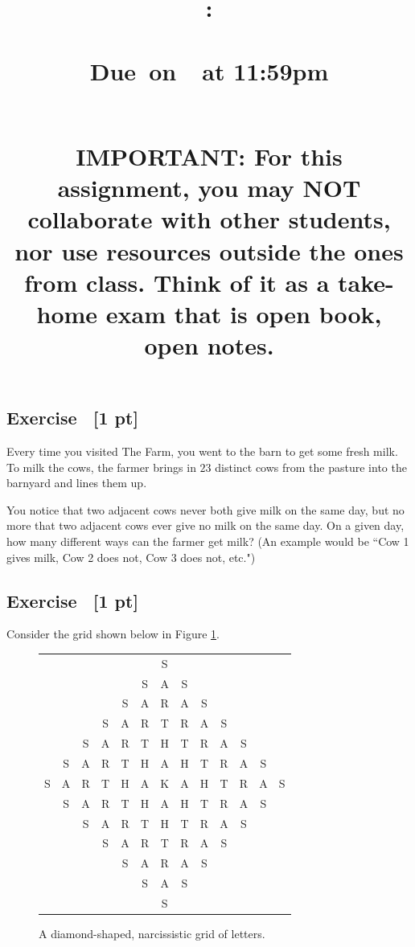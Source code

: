 \documentclass{article}
\title{
    \vspace{2in}
    \textbf{\hmwkClass:\\ \hmwkTitle} \\
    \normalsize\vspace{0.1in}\small{Due\ on\ \hmwkDueDate\ at 11:59pm} \\
    \vspace{0.1in}\large{\textit{\hmwkClassInstructor\ \hmwkSection}} \\
    \vspace{1in}
    \begin{minipage}[t]{0.5\columnwidth}
    {\footnotesize \textbf{IMPORTANT:} For this assignment, you may NOT collaborate with other students, nor use resources outside the ones from class. Think of it as a take-home exam that is open book, open notes.}
    \end{minipage}
    \vspace{1in}
    \author{\textbf{\hmwkAuthorName}}
    \date{}
}
\newcounter{counter}
\newcommand{\Exercise}{Exercise \stepcounter{counter}\thecounter}
\begin{document}
    
\maketitle
\pagebreak

\subsection*{\Exercise \ {\bf [1 pt]}}
    Every time you visited The Farm, you went to the barn to get some fresh milk. To milk the cows, the farmer brings in $23$ distinct cows from the pasture into the barnyard and lines them up.

    \vspace{1.5mm}
    You notice that two adjacent cows never both give milk on the same day, but no more that two adjacent cows ever give no milk on the same day. On a given day, how many different ways can the farmer get milk? (An example would be ``Cow 1 gives milk, Cow 2 does not, Cow 3 does not, etc.")

\subsection*{\Exercise \ {\bf [1 pt]}}
    Consider the grid shown below in Figure \ref{E2}.
    
    \vspace{1mm}
    \setlength{\tabcolsep}{2.7pt}
    \begin{figure}[hbp]
        \centering
        \begin{tabular}{ccccccccccccc}
            & & & & & & S \\
            & & & & & S & A & S \\
            & & & & S & A & R & A & S \\
            & & & S & A & R & T & R & A & S \\
            & & S & A & R & T & H & T & R & A & S \\
            & S & A & R & T & H & A & H & T & R & A & S \\
            S & A & R & T & H & A & K & A & H & T & R & A & S \\
            & S & A & R & T & H & A & H & T & R & A & S \\
            & & S & A & R & T & H & T & R & A & S \\
            & & & S & A & R & T & R & A & S \\
            & & & & S & A & R & A & S \\
            & & & & & S & A & S \\
            & & & & & & S
        \end{tabular}
        \caption{A diamond-shaped, narcissistic grid of letters.}
        \label{E2}
    \end{figure}
    
\end{document}
